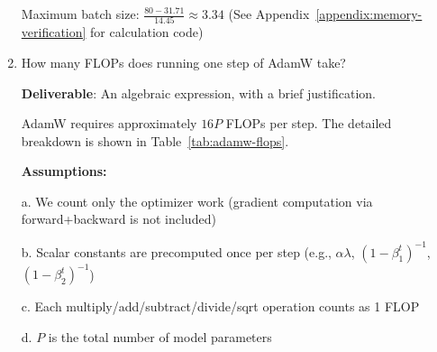 \begin{enumerate}[label=(\alph*)]
\begin{answer}
    Maximum batch size: $\frac{80 - 31.71}{14.45} \approx 3.34$
    (See Appendix~\ref{appendix:memory-verification} for calculation code)
    \end{answer}

    \item How many FLOPs does running one step of AdamW take?

    \textbf{Deliverable}: An algebraic expression, with a brief justification.

    \begin{answer}
    AdamW requires approximately $16P$ FLOPs per step. The detailed breakdown is shown in Table~\ref{tab:adamw-flops}.
    
    \textbf{Assumptions:}

    a. We count only the optimizer work (gradient computation via forward+backward is not included)
    
    b. Scalar constants are precomputed once per step (e.g., $\alpha\lambda$, $(1-\beta_1^t)^{-1}$, $(1-\beta_2^t)^{-1}$)
    
    c. Each multiply/add/subtract/divide/sqrt operation counts as 1 FLOP
    
    d. $P$ is the total number of model parameters
    \end{answer}


\end{enumerate}
